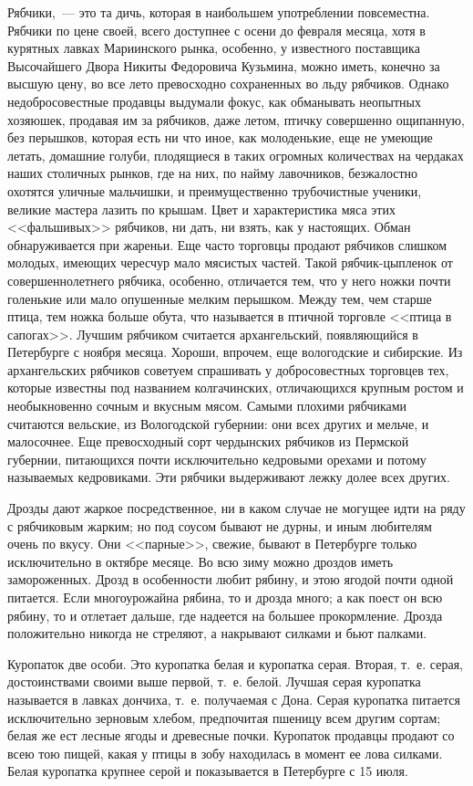 Рябчики,~--- это та дичь, которая в наибольшем употреблении повсеместна. Рябчики по цене своей, всего доступнее с осени до февраля месяца, хотя в курятных лавках Мариинского рынка, особенно, у известного поставщика Высочайшего Двора Никиты Федоровича Кузьмина, можно иметь, конечно за высшую цену, во все лето превосходно сохраненных во льду рябчиков. Однако недобросовестные продавцы выдумали фокус, как обманывать неопытных хозяюшек, продавая им за рябчиков, даже летом, птичку совершенно ощипанную, без перышков, которая есть ни что иное, как молоденькие, еще не умеющие летать, домашние голуби, плодящиеся в таких огромных количествах на чердаках наших столичных рынков, где на них, по найму лавочников, безжалостно охотятся уличные мальчишки, и преимущественно трубочистные ученики, великие мастера лазить по крышам. Цвет и характеристика мяса этих <<фальшивых>> рябчиков, ни дать, ни взять, как у настоящих. Обман обнаруживается при жареньи. Еще часто торговцы продают рябчиков слишком молодых, имеющих чересчур мало мясистых частей. Такой рябчик-цыпленок от совершеннолетнего рябчика, особенно, отличается тем, что у него ножки почти голенькие или мало опушенные мелким перышком. Между тем, чем старше птица, тем ножка больше обута, что называется в птичной торговле <<птица в сапогах>>. Лучшим рябчиком считается архангельский, появляющийся в Петербурге с ноября месяца. Хороши, впрочем, еще вологодские и сибирские. Из архангельских рябчиков советуем спрашивать у добросовестных торговцев тех, которые известны под названием колгачинских, отличающихся крупным ростом и необыкновенно сочным и вкусным мясом. Самыми плохими рябчиками считаются вельские, из Вологодской губернии: они всех других и мельче, и малосочнее. Еще превосходный сорт чердынских рябчиков из Пермской губернии, питающихся почти исключительно кедровыми орехами и потому называемых кедровиками. Эти рябчики выдерживают лежку долее всех других.

Дрозды дают жаркое посредственное, ни в каком случае не могущее идти на ряду с рябчиковым жарким; но под соусом бывают не дурны, и иным любителям очень по вкусу. Они <<парные>>, свежие, бывают в Петербурге только исключительно в октябре месяце. Во всю зиму можно дроздов иметь замороженных. Дрозд в особенности любит рябину, и этою ягодой почти одной питается. Если многоурожайна рябина, то и дрозда много; а как поест он всю рябину, то и отлетает дальше, где надеется на большее прокормление. Дрозда положительно никогда не стреляют, а накрывают силками и бьют палками.

Куропаток две особи. Это куропатка белая и куропатка серая. Вторая, т.~е. серая, достоинствами своими выше первой, т.~е. белой. Лучшая серая куропатка называется в лавках дончиха, т.~е. получаемая с Дона. Серая куропатка питается исключительно зерновым хлебом, предпочитая пшеницу всем другим сортам; белая же ест лесные ягоды и древесные почки. Куропаток продавцы продают со всею тою пищей, какая у птицы в зобу находилась в момент ее лова силками. Белая куропатка крупнее серой и показывается в Петербурге с 15 июля.

